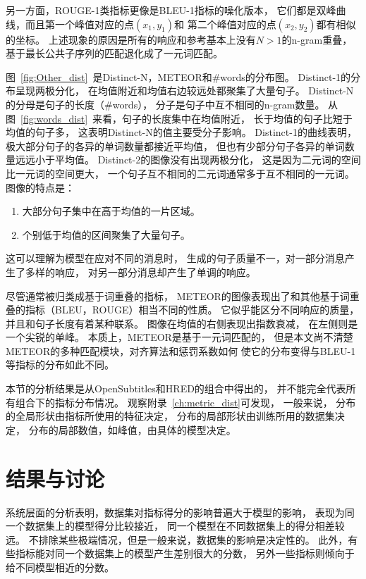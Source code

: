 另一方面，ROUGE-1类指标更像是BLEU-1指标的噪化版本， 它们都是双峰曲线，而且第一个峰值对应的点$(x_1, y_1)$和 第二个峰值对应的点$(x_2, y_2)$都有相似的坐标。 上述现象的原因是所有的响应和参考基本上没有$N > 1$的n-gram重叠， 基于最长公共子序列的匹配退化成了一元词匹配。


图~\ref{fig:Other_dist}~是Distinct-N，METEOR和\#words的分布图。 Distinct-1的分布呈现两极分化， 在均值附近和均值右边较远处都聚集了大量句子。 Distinct-N的分母是句子的长度（\#words）， 分子是句子中互不相同的n-gram数量。 从图~\ref{fig:words_dist}~来看，句子的长度集中在均值附近， 长于均值的句子比短于均值的句子多， 这表明Distinct-N的值主要受分子影响。 Distinct-1的曲线表明，极大部分句子的各异的单词数量都接近平均值， 但也有少部分句子各异的单词数量远远小于平均值。
Distinct-2的图像没有出现两极分化， 这是因为二元词的空间比一元词的空间更大， 一个句子互不相同的二元词通常多于互不相同的一元词。 图像的特点是：
\begin{enumerate}
    \item 大部分句子集中在高于均值的一片区域。
    \item 个别低于均值的区间聚集了大量句子。
\end{enumerate}
这可以理解为模型在应对不同的消息时， 生成的句子质量不一，对一部分消息产生了多样的响应， 对另一部分消息却产生了单调的响应。

尽管通常被归类成基于词重叠的指标， METEOR的图像表现出了和其他基于词重叠的指标（BLEU，ROUGE）相当不同的性质。 它似乎能区分不同响应的质量，并且和句子长度有着某种联系。 图像在均值的右侧表现出指数衰减， 在左侧则是一个尖锐的单峰。 本质上，METEOR是基于一元词匹配的， 但是本文尚不清楚METEOR的多种匹配模块，对齐算法和惩罚系数如何 使它的分布变得与BLEU-1等指标的分布如此不同。

本节的分析结果是从OpenSubtitles和HRED的组合中得出的， 并不能完全代表所有组合下的指标分布情况。 观察附录~\ref{ch:metric_dist}可发现， 一般来说， 分布的全局形状由指标所使用的特征决定， 分布的局部形状由训练所用的数据集决定， 分布的局部数值，如峰值，由具体的模型决定。

\section{结果与讨论}\label{sec:result_and_discussion}
系统层面的分析表明，数据集对指标得分的影响普遍大于模型的影响， 表现为同一个数据集上的模型得分比较接近， 同一个模型在不同数据集上的得分相差较远。 不排除某些极端情况，但是一般来说，数据集的影响是决定性的。 此外，有些指标能对同一个数据集上的模型产生差别很大的分数， 另外一些指标则倾向于给不同模型相近的分数。


